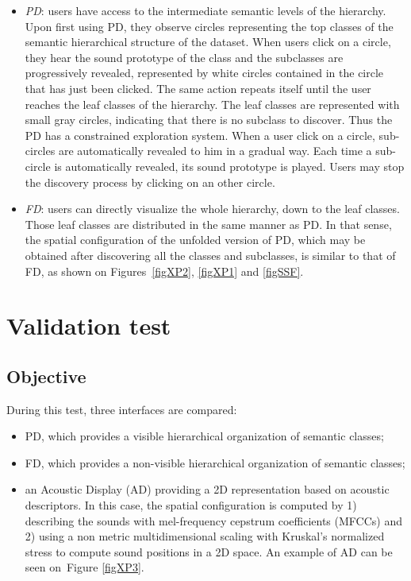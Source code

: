 \documentclass{aes2e}
\begin{document}
\begin{itemize}
\item \textit{PD}: users have access to the intermediate semantic levels of the hierarchy. Upon first using PD, they observe circles representing the top classes of the semantic hierarchical structure of the dataset. When users click on a circle, they hear the sound prototype of the class and the subclasses are progressively revealed, represented by white circles contained in the circle that has just been clicked. The same action repeats itself until the user reaches the leaf classes of the hierarchy. The leaf classes are represented with small gray circles, indicating that there is no subclass to discover. Thus the PD has a constrained exploration system. When a user click on a circle, sub-circles are  automatically revealed to him in a gradual way. Each time a sub-circle is automatically revealed, its sound prototype is played. Users may stop the discovery process by clicking on an other circle. 
\item \textit{FD}: users can directly visualize the whole hierarchy, down to the leaf classes. Those leaf classes are distributed  in the same manner as PD. In that sense, the spatial configuration of the unfolded version of PD, which may be obtained after discovering all the classes and subclasses, is similar to that of  FD, as shown on Figures~\ref{figXP2}, \ref{figXP1} and \ref{figSSF}.
\end{itemize}


\section{Validation test}
\subsection{Objective}
During this test, three interfaces are compared:
\begin{itemize}
\item PD, which provides a visible hierarchical organization of semantic classes;
\item FD, which provides a non-visible hierarchical organization of semantic classes;
\item an Acoustic Display (AD) providing a 2D representation based on acoustic descriptors. In this case, the spatial configuration is computed by 1) describing the sounds with mel-frequency cepstrum coefficients (MFCCs) and 2) using  a non metric multidimensional scaling with Kruskal's normalized stress to compute sound positions in a 2D space. An example of AD can be seen on~Figure \ref{figXP3}.
\end{itemize}
\end{document}
